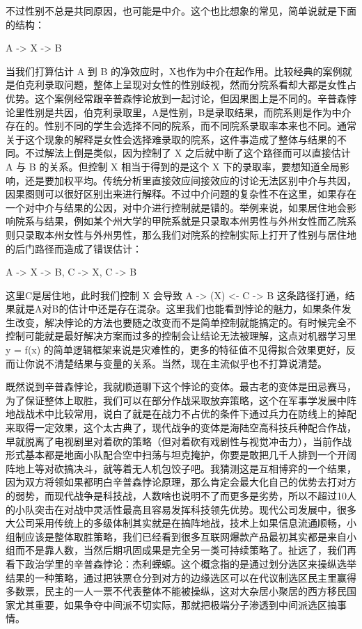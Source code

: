 \documentclass[]{tufte-book}
\begin{document}
不过性别不总是共同原因，也可能是中介。这个也比想象的常见，简单说就是下面的结构：

A -\textgreater{} X -\textgreater{} B

当我们打算估计 A 到 B 的净效应时，X也作为中介在起作用。比较经典的案例就是伯克利录取问题，整体上呈现对女性的性别歧视，然而分院系看却大都是女性占优势。这个案例经常跟辛普森悖论放到一起讨论，但因果图上是不同的。辛普森悖论里性别是共因，伯克利录取里，A是性别，B是录取结果，而院系则是作为中介存在的。性别不同的学生会选择不同的院系，而不同院系录取率本来也不同。通常关于这个现象的解释是女性会选择难录取的院系，这件事造成了整体与结果的不同。不过解法上倒是类似，因为控制了 X 之后就中断了这个路径而可以直接估计 A 与 B 的关系。但控制 X 相当于得到的是这个 X 下的录取率，要想知道全局影响，还是要加权平均。传统分析里直接效应间接效应的讨论无法区别中介与共因，因果图则可以很好区别出来进行解释。不过中介问题的复杂性不在这里，如果存在一个对中介与结果的公因，对中介进行控制就是错的。举例来说，如果居住地会影响院系与结果，例如某个州大学的甲院系就是只录取本州男性与外州女性而乙院系则只录取本州女性与外州男性，那么我们对院系的控制实际上打开了性别与居住地的后门路径而造成了错误估计：

A -\textgreater{} X -\textgreater{} B, C -\textgreater{} X, C -\textgreater{} B

这里C是居住地，此时我们控制 X 会导致 A -\textgreater{} (X) \textless- C -\textgreater{} B 这条路径打通，结果就是A对B的估计中还是存在混杂。这里我们也能看到悖论的魅力，如果条件发生改变，解决悖论的方法也要随之改变而不是简单控制就能搞定的。有时候完全不控制可能就是最好解决方案而过多的控制会让结论无法被理解，这点对机器学习里 y = f(x) 的简单逻辑框架来说是灾难性的，更多的特征值不见得拟合效果更好，反而让你说不清楚结果与变量的关系。当然，现在主流似乎也不打算说清楚。

既然说到辛普森悖论，我就顺道聊下这个悖论的变体。最古老的变体是田忌赛马，为了保证整体上取胜，我们可以在部分作战采取放弃策略，这个在军事学发展中阵地战战术中比较常用，说白了就是在战力不占优的条件下通过兵力在防线上的掉配来取得一定效果，这个太古典了，现代战争的变体是海陆空高科技兵种配合作战，早就脱离了电视剧里对着砍的策略（但对着砍有戏剧性与视觉冲击力），当前作战形式基本都是地面小队配合空中扫荡与坦克掩护，你要是敢把几千人排到一个开阔阵地上等对砍搞决斗，就等着无人机包饺子吧。我猜测这是互相博弈的一个结果，因为双方将领如果都明白辛普森悖论原理，那么肯定会最大化自己的优势去打对方的弱势，而现代战争是科技战，人数啥也说明不了而更多是劣势，所以不超过10人的小队突击在对战中灵活性最高且容易发挥科技领先优势。现代公司发展中，很多大公司采用传统上的多级体制其实就是在搞阵地战，技术上如果信息流通顺畅，小组制应该是整体取胜策略，我们已经看到很多互联网爆款产品最初其实都是来自小组而不是靠人数，当然后期巩固成果是完全另一类可持续策略了。扯远了，我们再看下政治学里的辛普森悖论：杰利蝾螈。这个概念指的是通过划分选区来操纵选举结果的一种策略，通过把铁票仓分到对方的边缘选区可以在代议制选区民主里赢得多数票，民主的一人一票不代表整体不能被操纵，这对大杂居小聚居的西方移民国家尤其重要，如果争夺中间派不切实际，那就把极端分子渗透到中间派选区搞事情。
\end{document}

